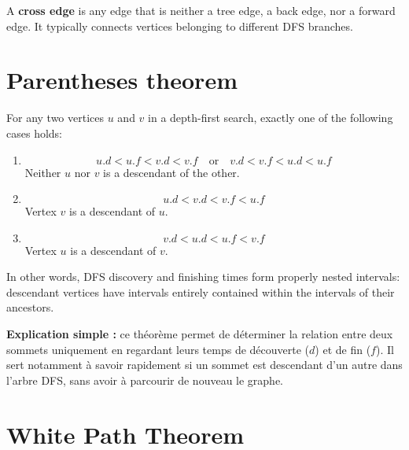 \documentclass[11pt,a4paper,openany]{book}
\begin{document}
\begin{defnbox}[title=Cross Edge]
A \textbf{cross edge} is any edge that is neither a tree edge, a back edge, nor a forward edge.  
It typically connects vertices belonging to different DFS branches.
\end{defnbox}




\vspace{2cm}





\section{Parentheses theorem}

\begin{defnbox}[title=Parenthesis Theorem (DFS)]
For any two vertices $u$ and $v$ in a depth-first search, exactly one of the following cases holds:

\begin{enumerate}
    \item
    \[
    u.d < u.f < v.d < v.f
    \quad \text{or} \quad
    v.d < v.f < u.d < u.f
    \]
    Neither $u$ nor $v$ is a descendant of the other.

    \item
    \[
    u.d < v.d < v.f < u.f
    \]
    Vertex $v$ is a descendant of $u$.

    \item
    \[
    v.d < u.d < u.f < v.f
    \]
    Vertex $u$ is a descendant of $v$.
\end{enumerate}

In other words, DFS discovery and finishing times form properly nested intervals: descendant vertices have intervals entirely contained within the intervals of their ancestors.

\medskip

\textbf{Explication simple :} ce théorème permet de déterminer la relation entre deux sommets uniquement en regardant leurs temps de découverte ($d$) et de fin ($f$). Il sert notamment à savoir rapidement si un sommet est descendant d'un autre dans l'arbre DFS, sans avoir à parcourir de nouveau le graphe.
\end{defnbox}



\vspace{2cm}





\section{White Path Theorem}
\end{document}
